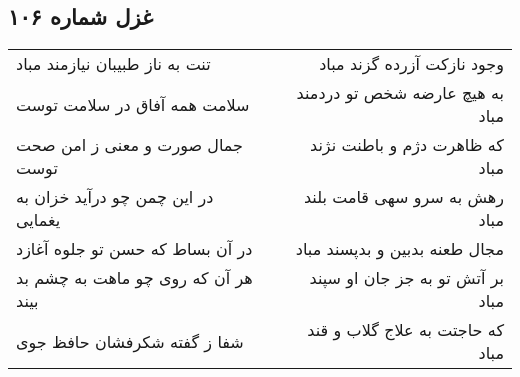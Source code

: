 \begin{center}
\section*{غزل شماره ۱۰۶}
\label{sec:sh106}
\begin{longtable}{l p{0.5cm} r}
تنت به ناز طبیبان نیازمند مباد
&&
وجود نازکت آزرده گزند مباد
\\
سلامت همه آفاق در سلامت توست
&&
به هیچ عارضه شخص تو دردمند مباد
\\
جمال صورت و معنی ز امن صحت توست
&&
که ظاهرت دژم و باطنت نژند مباد
\\
در این چمن چو درآید خزان به یغمایی
&&
رهش به سرو سهی قامت بلند مباد
\\
در آن بساط که حسن تو جلوه آغازد
&&
مجال طعنه بدبین و بدپسند مباد
\\
هر آن که روی چو ماهت به چشم بد بیند
&&
بر آتش تو به جز جان او سپند مباد
\\
شفا ز گفته شکرفشان حافظ جوی
&&
که حاجتت به علاج گلاب و قند مباد
\\
\end{longtable}
\end{center}
